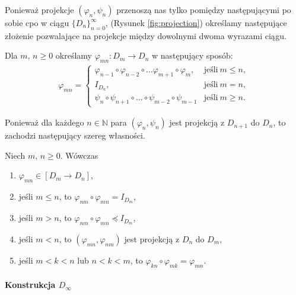 Ponieważ projekcje \((\varphi_n, \psi_n)\) przenoszą nas tylko pomiędzy następującymi po sobie cpo w ciągu \(\{D_n\}_{n=0}^\infty\), (Rysunek \ref{fig:projection}) określamy następujące złożenie pozwalające na projekcje między dowolnymi dwoma wyrazami ciągu.

\begin{definicja}%
Dla \(m,\,n\geq 0\) określamy \(\varphi_{mn}:D_m \to D_n\) w następujący sposób:
\begin{align*}
\varphi_{mn} =
\begin{cases}
\varphi_{n-1} \circ \varphi_{n-2} \circ \dots \varphi_{m+1} \circ \varphi_m, & \text{jeśli}\ m\leq n,\\
I_{D_n}, & \text{jeśli}\ m=n,\\
\psi_n \circ \psi_{n+1} \circ \dots \circ \psi_{m-2}\circ \psi_{m-1} & \text{jeśli}\ m\geq n.
\end{cases}
\end{align*}
\end{definicja}

Ponieważ dla każdego \(n\in \mathbb{N}\) para \((\varphi_n, \psi_n)\) jest projekcją z \(D_{n+1}\) do \(D_n\), to zachodzi następujący szereg własności.

\begin{fakt}%
Niech \(m,\,n\geq 0\). Wówczas
\begin{enumerate}[label={(\roman*)}, ref={(\roman*)}] 
  \setlength\itemsep{0em}
\item \(\varphi_{mn}\in [D_m\to D_n]\),
\item jeśli \(m\leq n\), to \(\varphi_{nm}\circ \varphi_{mn} = I_{D_m}\),
\item jeśli \(m>n\), to \(\varphi_{nm}\circ \varphi_{mn} \preceq I_{D_m}\),
\item jeśli \(m<n\), to \((\varphi_{mn},\varphi_{nm})\) jest projekcją z \(D_n\) do \(D_m\),
\item jeśli \(m<k<n\) lub \(n<k<m\), to \(\varphi_{kn}\circ\varphi_{mk}=\varphi_{mn}\).
\end{enumerate}
\end{fakt}

\paragraph{Konstrukcja \(D_\infty\)}

